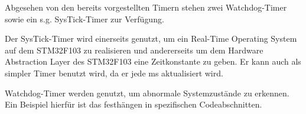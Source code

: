\smallskip

Abgesehen von den bereits vorgestellten Timern stehen zwei Watchdog-Timer sowie ein s.g. SysTick-Timer zur Verfügung.

Der SysTick-Timer wird einerseits genutzt, um ein Real-Time Operating System auf dem STM32F103 zu realisieren und andererseits um 
dem Hardware Abstraction Layer des STM32F103 eine Zeitkonstante zu geben. Er kann auch als simpler Timer benutzt wird, da er jede
ms aktualisiert wird.

\smallskip

Watchdog-Timer werden genutzt, um abnormale Systemzustände zu erkennen. Ein Beispiel hierfür ist das festhängen in spezifischen Codeabschnitten.



